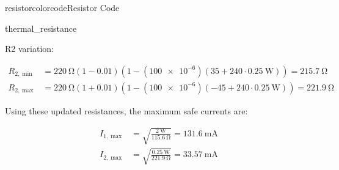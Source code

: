 \begin{mainquestion}{resistorcolorcode}{Resistor Code}
\begin{partquestion}{thermal_resistance}
\begin{answer}
R2 variation:

\begin{align*}
R_{2,\min} &=
\qty{220}{\ohm}\left(1-\num{0.01}\right)
\left(1-(\num{100e-6})\left(35 + 240\cdot \qty{0.25}{\watt}\right)\right)
= \qty{215.7}{\ohm} \\
R_{2,\max} &=
\qty{220}{\ohm}\left(1+\num{0.01}\right)
\left(1-(\num{100e-6})\left(-45 + 240\cdot \qty{0.25}{\watt}\right)\right)
= \qty{221.9}{\ohm}
\end{align*}

Using these updated resistances, the maximum safe currents are:

\begin{align*}
I_{1,\max} &= \sqrt{\frac{\qty{2}{\watt}}{\qty{115.6}{\ohm}}}
= \qty{131.6}{\milli\ampere} \\
I_{2,\max} &= \sqrt{\frac{\qty{0.25}{\watt}}{\qty{221.9}{\ohm}}}
= \qty{33.57}{\milli\ampere}
\end{align*}

\end{answer}
\end{partquestion}

\end{mainquestion}